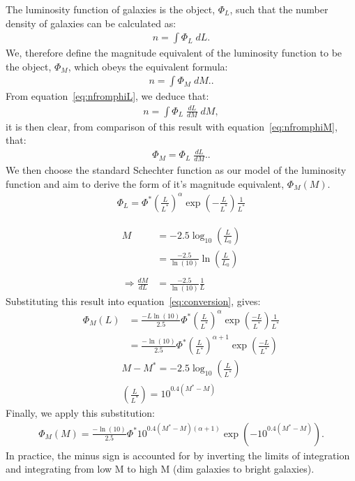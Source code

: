 \documentclass[pdf,color]{UoBnote}
\begin{document}
The luminosity function of galaxies is the object, $\Phi_L$, such that the number density of galaxies can be calculated as:
\begin{align}		
			n = \int { \Phi_L \; dL }.\label{eq:nfromphiL}
\end{align}
We, therefore define the magnitude equivalent of the luminosity function to be the object, $\Phi_M$, which obeys the equivalent formula:
\begin{align}		
			n = \int { \Phi_M \; dM }.\label{eq:nfromphiM}.
\end{align}
From equation~\ref{eq:nfromphiL}, we deduce that:
\begin{align}		
			n = \int { \Phi_L \; \frac{dL}{dM}\; dM },
\end{align}
it is then clear, from comparison of this result with equation~\ref{eq:nfromphiM}, that:
\begin{align}		
			\Phi_M = \Phi_L \; \frac{dL}{dM}.\label{eq:conversion}.
\end{align}
We then choose the standard Schechter function as our model of the luminosity function and aim to derive the form of it's magnitude equivalent, $\Phi_M(M)$.
\begin{align}	
			\Phi_L = \Phi^*  \left(\frac{L}{L^*}\right)^\alpha \exp{\left( -\frac{L}{L^*} \right)} \frac{1}{L^*}
\end{align}

\begin{align}	
			M &= -2.5\log_{10}\left ( \frac{L}{L_0}\right) \\
			   &= \frac{-2.5}{\ln(10)} \ln\left ( \frac{L}{L_0}\right) \\ \\
	\Rightarrow \frac{dM}{dL} &= \frac{-2.5}{\ln(10)} \frac{1}{L}
\end{align}
Substituting this result into equation~\ref{eq:conversion}, gives:
\begin{align}		
			\Phi_M(L) &= \frac{-L\ln(10)}{2.5} \Phi^*  \left(\frac{L}{L^*}\right)^\alpha \exp{\left( \frac{-L}{L^*} \right)} \frac{1}{L^*} \\
				     &= \frac{-\ln(10)}{2.5} \Phi^*  \left(\frac{L}{L^*}\right)^{\alpha+1} \exp{\left( \frac{-L}{L^*} \right)} 
\end{align}
\begin{align}
			M - M^* = -2.5 \log_{10}\left( \frac{L}{L^*} \right)	\\
			\left( \frac{L}{L^*} \right)	 = 10^{0.4(M^*-M)}
\end{align}
Finally, we apply this substitution:
\begin{align}		
			\Phi_M(M) = \frac{-\ln(10)}{2.5} \Phi^*  10^{0.4(M^*-M)(\alpha+1)} \exp(-10^{0.4(M^*-M)}) .
\end{align}
In practice, the minus sign is accounted for by inverting the limits of integration and integrating from low M to high M (dim galaxies to bright galaxies).
\end{document}
